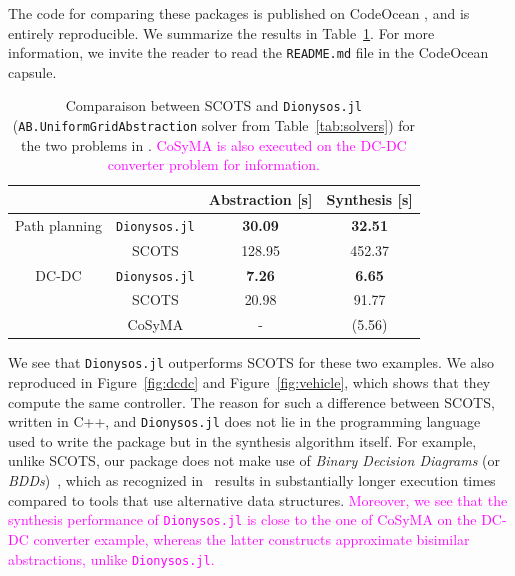 \documentclass{juliacon}
\begin{document}
\vspace{6pt}

The code for comparing these packages is published on CodeOcean \cite{Calbert2024}, and is entirely reproducible. We summarize the results in Table~\ref{tab:benchmark}. For more information, we invite the reader to read the \texttt{README.md} file in the CodeOcean capsule.

\begin{table}[ht!]
    \centering
    \color{magenta}
    \begin{tabular}{cc|cc}
        & & Abstraction [s] & Synthesis [s] \\ 
        \hline 
        Path planning & \texttt{Dionysos.jl} & \textbf{30.09} & \textbf{32.51} \\
        & SCOTS & 128.95 & 452.37 \\
        \hline
        DC-DC & \texttt{Dionysos.jl} & \textbf{7.26} & \textbf{6.65} \\
        & SCOTS & 20.98 & 91.77 \\ 
        & CoSyMA & - & (5.56)
    \end{tabular}
    \color{black}
    \caption{Comparaison between SCOTS and \texttt{Dionysos.jl} (\texttt{AB.UniformGridAbstraction} solver from Table~\ref{tab:solvers}) for the two problems in \cite{rungger2016scots}. \textcolor{magenta}{CoSyMA is also executed on the DC-DC converter problem for information.}}
    \label{tab:benchmark}
\end{table}

We see that \texttt{Dionysos.jl} outperforms SCOTS for these two examples. We also reproduced \cite[Figures 3 and 4]{rungger2016scots} in Figure~\ref{fig:dcdc} and Figure~\ref{fig:vehicle}, which shows that they compute the same controller. The reason for such a difference between SCOTS, written in C++, and \texttt{Dionysos.jl} does not lie in the programming language used to write the package but in the synthesis algorithm itself. For example, unlike SCOTS, our package does not make use of \emph{Binary Decision Diagrams} (or \emph{BDDs})~\cite{bryant1992symbolic}, which as recognized in~\cite{rungger2016scots} results in substantially longer execution times compared to tools that use alternative data structures. \textcolor{magenta}{Moreover, we see that the synthesis performance of \texttt{Dionysos.jl} is close to the one of CoSyMA on the DC-DC converter example, whereas the latter constructs approximate bisimilar abstractions, unlike \texttt{Dionysos.jl}.}


\end{document}
